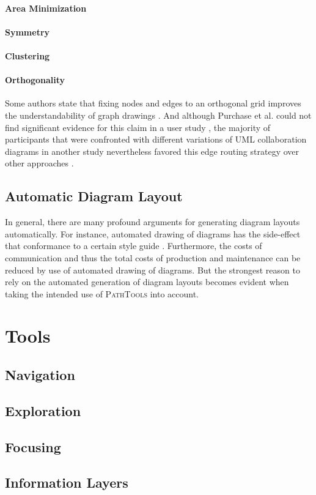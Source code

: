 \paragraph{Area Minimization}

\paragraph{Symmetry}

\paragraph{Clustering}

\paragraph{Orthogonality} Some authors state that fixing nodes and edges to an orthogonal grid improves the understandability of graph drawings \cite{batini_what_1985}.
And although Purchase et al. could not find significant evidence for this claim in a user study \cite{purchase_which_1997}, the majority of participants that were confronted with different variations of UML collaboration diagrams in another study nevertheless favored this edge routing strategy over other approaches \cite{purchase_graph_2004}.

\subsection{Automatic Diagram Layout}
In general, there are many profound arguments for generating diagram layouts automatically.
For instance, automated drawing of diagrams has the side-effect that conformance to a certain style guide .
Furthermore, the costs of communication and thus the total costs of production and maintenance can be reduced by use of automated drawing of diagrams.
But the strongest reason to rely on the automated generation of diagram layouts becomes evident when taking the intended use of \textsc{PathTools} into account.


\section{Tools}
\subsection{Navigation}
\subsection{Exploration}
\subsection{Focusing}
\subsection{Information Layers}